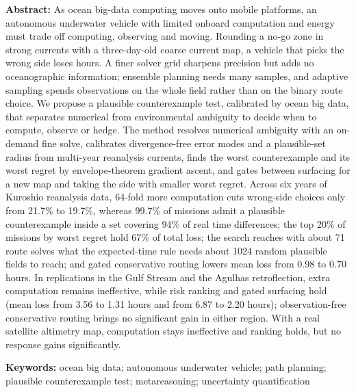 {\bfseries Abstract:}
As ocean big-data computing moves onto mobile platforms, an autonomous underwater vehicle with limited onboard computation and energy must trade off computing, observing and moving. Rounding a no-go zone in strong currents with a three-day-old coarse current map, a vehicle that picks the wrong side loses hours. A finer solver grid sharpens precision but adds no oceanographic information; ensemble planning needs many samples, and adaptive sampling spends observations on the whole field rather than on the binary route choice. We propose a plausible counterexample test, calibrated by ocean big data, that separates numerical from environmental ambiguity to decide when to compute, observe or hedge. The method resolves numerical ambiguity with an on-demand fine solve, calibrates divergence-free error modes and a plausible-set radius from multi-year reanalysis currents, finds the worst counterexample and its worst regret by envelope-theorem gradient ascent, and gates between surfacing for a new map and taking the side with smaller worst regret. Across six years of Kuroshio reanalysis data, 64-fold more computation cuts wrong-side choices only from 21.7\% to 19.7\%, whereas 99.7\% of missions admit a plausible counterexample inside a set covering 94\% of real time differences; the top 20\% of missions by worst regret hold 67\% of total loss; the search reaches with about 71 route solves what the expected-time rule needs about 1024 random plausible fields to reach; and gated conservative routing lowers mean loss from 0.98 to 0.70 hours. In replications in the Gulf Stream and the Agulhas retroflection, extra computation remains ineffective, while risk ranking and gated surfacing hold (mean loss from 3.56 to 1.31 hours and from 6.87 to 2.20 hours); observation-free conservative routing brings no significant gain in either region. With a real satellite altimetry map, computation stays ineffective and ranking holds, but no response gains significantly.

{\bfseries Keywords:} ocean big data; autonomous underwater vehicle; path planning; plausible counterexample test; metareasoning; uncertainty quantification
